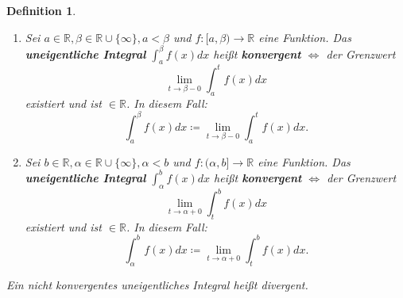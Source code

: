 \documentclass[12pt]{extreport} %
\newcommand{\R}{\mathbb{R}}
\theoremstyle{named}
\theoremstyle{dotless}
\newtheorem*{definition}{Definition}
\begin{document}
 
\begin{definition} ~\
	\begin{enumerate}
		\item Sei $a \in \R, \beta \in \R \cup \{ \infty \}, a < \beta$ und $f \colon [a, \beta) \rightarrow \R$ eine Funktion. Das \textbf{uneigentliche Integral} $\int_{a}^{\beta} f(x) dx$ hei{\ss}t \textbf{konvergent} $\iff$ der Grenzwert
			$$ \lim_{t \rightarrow \beta - 0} \int_{a}^{t} f(x) dx $$
			existiert und ist $\in \R$. In diesem Fall:
			$$ \int_{a}^{\beta} f(x) dx \coloneqq \lim_{t \rightarrow \beta - 0} \int_{a}^{t} f(x) dx. $$
		\item Sei $b \in \R, \alpha \in \R \cup \{ \infty \}, \alpha < b$ und $f \colon (\alpha, b] \rightarrow \R$ eine Funktion. Das \textbf{uneigentliche Integral} $\int_{\alpha}^{b} f(x) dx$ hei{\ss}t \textbf{konvergent} $\iff$ der Grenzwert
			$$ \lim_{t \rightarrow \alpha + 0} \int_{t}^{b} f(x) dx $$
			existiert und ist $\in \R$. In diesem Fall:
			$$ \int_{\alpha}^{b} f(x) dx \coloneqq \lim_{t \rightarrow \alpha + 0} \int_{t}^{b} f(x) dx. $$
	\end{enumerate}
	Ein nicht konvergentes uneigentliches Integral hei{\ss}t divergent.
	
\end{definition}
\end{document}
